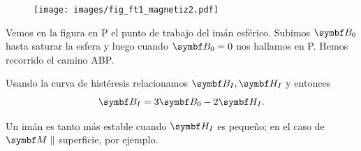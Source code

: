 \documentclass[10pt,oneside]{CBFT_book}
\begin{document}
\begin{figure}[htb]
	\begin{center}
	\texttt{[image: images/fig\_ft1\_magnetiz2.pdf]}	 
	\end{center}
	\caption{}
\end{figure} 

Vemos en la figura en P el punto de trabajo del imán esférico. Subimos $\vb{B}_0$ hasta saturar la
esfera y luego cuando $\vb{B}_0 = 0$ nos hallamos en P. Hemos recorrido el camino ABP.

Usando la curva de histéresis relacionamos $\vb{B}_I, \vb{H}_I$ y entonces
\[
	\vb{B}_I = 3 \vb{B}_0  - 2 \vb{H}_I.
\]

Un imán es tanto más estable cuando $\vb{H}_I$ es pequeño; en el caso de $\vb{M} \parallel$ superficie,
por ejemplo.

\end{document}
